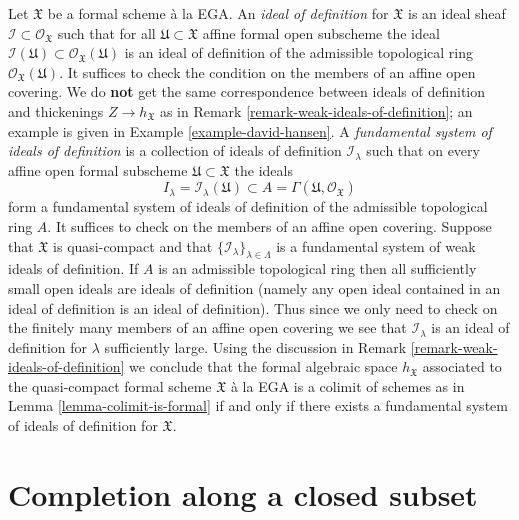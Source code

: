 \begin{remark}
\label{remark-ideals-of-definition}
Let $\mathfrak X$ be a formal scheme \`a la EGA.
An {\it ideal of definition} for $\mathfrak X$ is an ideal sheaf
$\mathcal{I} \subset \mathcal{O}_\mathfrak X$ such that
for all $\mathfrak U \subset \mathfrak X$ affine formal open subscheme
the ideal
$\mathcal{I}(\mathfrak U) \subset \mathcal{O}_\mathfrak X(\mathfrak U)$
is an ideal of definition of the admissible topological ring
$\mathcal{O}_\mathfrak X(\mathfrak U)$.
It suffices to check the condition on the members of an affine open covering.
We do {\bf not} get the same correspondence between ideals of definition
and thickenings $Z \to h_\mathfrak X$ as in
Remark \ref{remark-weak-ideals-of-definition}; an example
is given in Example \ref{example-david-hansen}.
A {\it fundamental system of ideals of definition}
is a collection of ideals of definition
$\mathcal{I}_\lambda$ such that on every affine open
formal subscheme $\mathfrak U \subset \mathfrak X$ the
ideals
$$
I_\lambda = \mathcal{I}_\lambda(\mathfrak U) \subset
A = \Gamma(\mathfrak U, \mathcal{O}_\mathfrak X)
$$
form a fundamental system of ideals of definition of the
admissible topological ring $A$. It suffices to check
on the members of an affine open covering. Suppose that $\mathfrak X$
is quasi-compact and that $\{\mathcal{I}_\lambda\}_{\lambda \in \Lambda}$
is a fundamental system of weak ideals of definition.
If $A$ is an admissible topological ring then all
sufficiently small open ideals are ideals of definition
(namely any open ideal contained in an ideal of definition
is an ideal of definition). Thus since we only need to check
on the finitely many members of an affine open covering
we see that $\mathcal{I}_\lambda$ is an ideal of definition
for $\lambda$ sufficiently large. Using the discussion in
Remark \ref{remark-weak-ideals-of-definition} we conclude that
the formal algebraic space $h_\mathfrak X$ associated to
the quasi-compact formal scheme $\mathfrak X$ \`a la EGA
is a colimit of schemes as in Lemma \ref{lemma-colimit-is-formal}
if and only if there exists a fundamental system of ideals of definition
for $\mathfrak X$.
\end{remark}






\section{Completion along a closed subset}
\label{section-completion}

